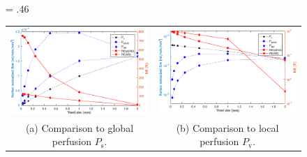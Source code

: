 \documentclass[final,5p,times,twocolumn]{elsarticle}
\begin{document}
    \begin{figure}[]
    	\centering
    	\fwd = .46\textwidth
    	\begin{tabular}{c c}
    		\includegraphics[width=\fwd]{figs/E110_CBFOnDifferentResolutions_plot-Ps-scaleto-S.eps} & \includegraphics[width=\fwd]{figs/E110_CBFOnDifferentResolutions_plot-Pv-scaleto-S.eps}\\	
    		(a) Comparison to global perfusion $P_{\mathrm{s}}$. & (b) Comparison to local perfusion $P_{\mathrm{v}}$.
    	\end{tabular}
    	\caption*{}
            \label{fig:surfnormperfFIG}
    \end{figure}
\clearpage
\end{document}

